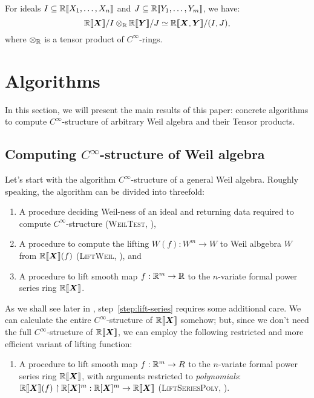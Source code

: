 \documentclass[%
  sigconf,authorversion,screen]{acmart}
\begin{document}
\begin{theorem}
  \label{thm:quot-tensor}
  For ideals $I \subseteq \mathbb{R}\llbracket{}X_1, \dots, X_n\rrbracket$ and $J \subseteq \mathbb{R}\llbracket{}Y_1, \dots, Y_m\rrbracket$, we have:
  \[
    \mathord{\mathbb{R}\llbracket\boldsymbol{X}\rrbracket}/I \otimes_{\mathbb{R}} \mathbb{R}\llbracket{}\boldsymbol{Y}\rrbracket/J \simeq
    \mathbb{R}\llbracket{}\boldsymbol{X}, \boldsymbol{Y}\rrbracket/(I, J),
  \]
  where $\otimes_{\mathbb{R}}$ is a tensor product of $C^\infty$-rings.
\end{theorem}


\section{Algorithms}\label{sec:alg}
In this section, we will present the main results of this paper: concrete algorithms to compute $C^\infty$-structure of arbitrary Weil algebra and their Tensor products.

\subsection{Computing $C^\infty$-structure of Weil algebra}
\label{sec:general-weil-algs}
Let's start with the algorithm $C^\infty$-structure of a general Weil algebra.
Roughly speaking, the algorithm can be divided into threefold:

\begin{enumerate}
  \item A procedure deciding Weil-ness of an ideal and returning data required to compute $C^\infty$-structure (\textsc{WeilTest}, ),
  \item A procedure to compute the lifting  $W(f): W^m \to W$ to Weil albgebra $W$ from $\mathord{\mathbb{R}\llbracket\boldsymbol{X}\rrbracket}(f)$ (\textsc{LiftWeil}, ), and
  \item A procedure to lift smooth map $f: \mathbb{R}^m \to \mathbb{R}$ to the $n$-variate formal power series ring $\mathord{\mathbb{R}\llbracket\boldsymbol{X}\rrbracket}$.\label{step:lift-series}
\end{enumerate}

As we shall see later in , step~\ref{step:lift-series} requires some additional care.
We can calculate the entire $C^\infty$-structure of $\mathord{\mathbb{R}\llbracket\boldsymbol{X}\rrbracket}$ somehow; but, since we don't need the full $C^\infty$-structure of $\mathord{\mathbb{R}\llbracket\boldsymbol{X}\rrbracket}$, we can employ the following restricted and more efficient variant of lifting function:

\begin{enumerate}[label=$(3)'$]
  \item A procedure to lift smooth map $f: \mathbb{R}^m \to R$ to the $n$-variate formal power series ring $\mathord{\mathbb{R}\llbracket\boldsymbol{X}\rrbracket}$, with arguments restricted to \emph{polynomials}: $\mathord{\mathbb{R}\llbracket\boldsymbol{X}\rrbracket}(f) \upharpoonright \mathbb{R}[\boldsymbol{X}]^m : \mathbb{R}[\boldsymbol{X}]^m \to \mathord{\mathbb{R}\llbracket\boldsymbol{X}\rrbracket}$
  (\textsc{LiftSeriesPoly}, ).
\end{enumerate}
\end{document}
